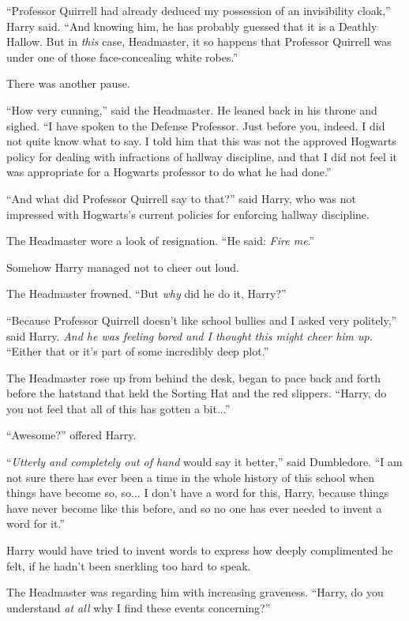``Professor Quirrell had already deduced my possession of an invisibility cloak,'' Harry said. ``And knowing him, he has probably guessed that it is a Deathly Hallow. But in \emph{this} case, Headmaster, it so happens that Professor Quirrell was under one of those face-concealing white robes.''

There was another pause.

``How very cunning,'' said the Headmaster. He leaned back in his throne and sighed. ``I have spoken to the Defense Professor. Just before you, indeed. I did not quite know what to say. I told him that this was not the approved Hogwarts policy for dealing with infractions of hallway discipline, and that I did not feel it was appropriate for a Hogwarts professor to do what he had done.''

``And what did Professor Quirrell say to that?'' said Harry, who was not impressed with Hogwarts's current policies for enforcing hallway discipline.

The Headmaster wore a look of resignation. ``He said: \emph{Fire me}.''

Somehow Harry managed not to cheer out loud.

The Headmaster frowned. ``But \emph{why} did he do it, Harry?''

``Because Professor Quirrell doesn't like school bullies and I asked very politely,'' said Harry. \emph{And he was feeling bored and I thought this might cheer him up.} ``Either that or it's part of some incredibly deep plot.''

The Headmaster rose up from behind the desk, began to pace back and forth before the hatstand that held the Sorting Hat and the red slippers. ``Harry, do you not feel that all of this has gotten a bit...''

``Awesome?'' offered Harry.

``\emph{Utterly and completely out of hand} would say it better,'' said Dumbledore. ``I am not sure there has ever been a time in the whole history of this school when things have become so, so... I don't have a word for this, Harry, because things have never become like this before, and so no one has ever needed to invent a word for it.''

Harry would have tried to invent words to express how deeply complimented he felt, if he hadn't been snerkling too hard to speak.

The Headmaster was regarding him with increasing graveness. ``Harry, do you understand \emph{at all} why I find these events concerning?''

